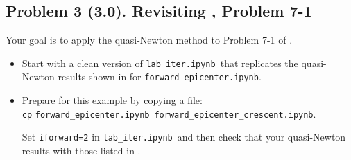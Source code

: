\documentclass[11pt,titlepage,fleqn]{article}
\newcommand{\tfile}{{\tt lab\_iter.ipynb}}
\newcommand{\tfileFE}{{\tt forward\_epicenter.ipynb}}
\newcommand{\tfileFEC}{{\tt forward\_epicenter\_crescent.ipynb}}
\begin{document}

\clearpage\pagebreak
\subsection*{Problem 3 (3.0). Revisiting \citet{Tarantola2005}, Problem 7-1}

Your goal is to apply the quasi-Newton method to Problem 7-1 of \citet{Tarantola2005}.
%
\begin{itemize}
\item Start with a clean version of \tfile\ that replicates the quasi-Newton results shown in  for \tfileFE.

\item Prepare for this example by copying a file: \\
\verb+cp+ \tfileFE\ \tfileFEC.

Set \verb+iforward=2+ in \tfile\ and then check that your quasi-Newton results with those listed in .


\end{itemize}

\end{document}
